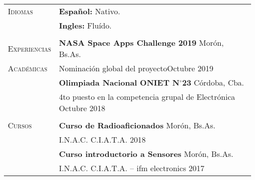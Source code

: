 \documentclass[12pt]{article}
\begin{document}
\begin{tabular}[t]{@{}p{1.15in} @{}p{5.35in}}
   {\scshape Idiomas}
   &
   \textbf{Español: }  Nativo.
   \vspace{0.5\baselineskip}
   \\
   &
   \textbf{Ingles: }  Fluído.
   \\
   \vspace{1\baselineskip}
   \\
   
   {\scshape Experiencias}
   &
   \textbf{NASA Space Apps Challenge 2019}  \hfill Morón, Bs.As.\vspace{0.015in} \\ 
   {\scshape Académicas} %
   & Nominación global del proyecto\hfill Octubre 2019\vspace{0.015in}
   \vspace{0.5\baselineskip}
   \\
   & \textbf{Olimpiada Nacional ONIET N$^{\circ}$23}  \hfill Córdoba, Cba.\vspace{0.015in} \\ &
   4to puesto en la competencia grupal de Electrónica \hfill Octubre 2018\vspace{0.015in}
   \\
   \vspace{1\baselineskip}
   \\
   {\scshape Cursos}
   &
   \textbf{Curso de Radioaficionados}  \hfill Morón, Bs.As.\vspace{0.015in} \\ 
   & I.N.A.C. C.I.A.T.A. \hfill 2018\vspace{0.015in}
   \vspace{0.5\baselineskip}
   \\
   & \textbf{Curso introductorio a Sensores}  \hfill Morón, Bs.As.\vspace{0.015in} \\ &
   I.N.A.C. C.I.A.T.A. -- ifm electronics \hfill 2017\vspace{0.015in}
   \\

   \end{tabular}
\end{document}
